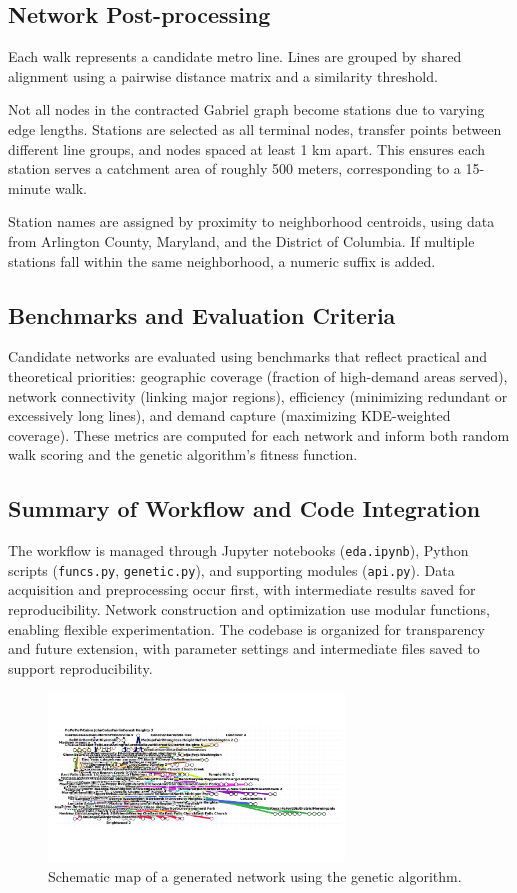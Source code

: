 \documentclass[manuscript]{acmart}
\begin{document}
\subsection{Network Post-processing}
Each walk represents a candidate metro line. Lines are grouped by shared alignment using a pairwise distance matrix and a similarity threshold.

Not all nodes in the contracted Gabriel graph become stations due to varying edge lengths. Stations are selected as all terminal nodes, transfer points between different line groups, and nodes spaced at least 1 km apart. This ensures each station serves a catchment area of roughly 500 meters, corresponding to a 15-minute walk.

Station names are assigned by proximity to neighborhood centroids, using data from Arlington County, Maryland, and the District of Columbia. If multiple stations fall within the same neighborhood, a numeric suffix is added.

\subsection{Benchmarks and Evaluation Criteria}
Candidate networks are evaluated using benchmarks that reflect practical and theoretical priorities: geographic coverage (fraction of high-demand areas served), network connectivity (linking major regions), efficiency (minimizing redundant or excessively long lines), and demand capture (maximizing KDE-weighted coverage). These metrics are computed for each network and inform both random walk scoring and the genetic algorithm's fitness function.

\subsection{Summary of Workflow and Code Integration}
The workflow is managed through Jupyter notebooks (\texttt{eda.ipynb}), Python scripts (\texttt{funcs.py}, \texttt{genetic.py}), and supporting modules (\texttt{api.py}). Data acquisition and preprocessing occur first, with intermediate results saved for reproducibility. Network construction and optimization use modular functions, enabling flexible experimentation. The codebase is organized for transparency and future extension, with parameter settings and intermediate files saved to support reproducibility.

\begin{figure}[h]
    \centering
    \includegraphics[width=0.7\textwidth]{img/lines_genetic.png}
    \caption{Schematic map of a generated network using the genetic algorithm.}
    \label{fig:schematic2}
\end{figure}
\end{document}
